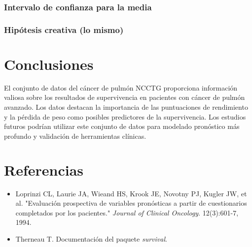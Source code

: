 \documentclass[a4paper,12pt]{article}
\begin{document}
    \subsubsection*{Intervalo de confianza para la media}

    \subsubsection*{Hipótesis creativa (lo mismo)}

    

	\section*{Conclusiones}
	El conjunto de datos del cáncer de pulmón NCCTG proporciona información valiosa sobre los resultados de supervivencia en pacientes con cáncer de pulmón avanzado. Los datos destacan la importancia de las puntuaciones de rendimiento y la pérdida de peso como posibles predictores de la supervivencia. Los estudios futuros podrían utilizar este conjunto de datos para modelado pronóstico más profundo y validación de herramientas clínicas.
	
	\section*{Referencias}
	\begin{itemize}
		\item Loprinzi CL, Laurie JA, Wieand HS, Krook JE, Novotny PJ, Kugler JW, et al. "Evaluación prospectiva de variables pronósticas a partir de cuestionarios completados por los pacientes." \textit{Journal of Clinical Oncology}. 12(3):601-7, 1994.
		\item Therneau T. Documentación del paquete \textit{survival}.
	\end{itemize}
	
\end{document}

